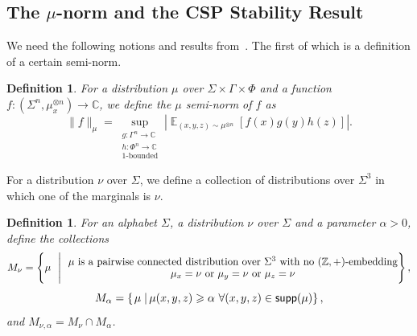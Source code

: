 \documentclass[11pt]{article}
\newtheorem{definition}[thm]{Definition}
\newcommand\card[1]{\left| {#1} \right|}
\newcommand\sett[2]{\left\{ \left. #1 \;\right\vert #2 \right\}}
\newcommand\norm[1]{\| #1 \|}
\newcommand\Expect[2]{{\mathop{\mathbb{E}}_{#1}\left[ {#2} \right]}}
\renewcommand\geq{\geqslant}
\begin{document}
\subsection{The \texorpdfstring{$\mu$}{mu}-norm and the CSP Stability Result}
We need the following notions and results from~\cite{BKM5}. The first of which is a definition of a certain semi-norm.
	\begin{definition}
		For a distribution $\mu$ over $\Sigma\times \Gamma\times \Phi$
		and a function $f\colon (\Sigma^n,\mu_x^{\otimes n})\to\mathbb{C}$,
		we define the $\mu$ semi-norm of $f$ as
		\[
		\norm{f}_{\mu}
		=\sup_{\substack{g\colon \Gamma^n\to\mathbb{C}\\ h\colon \Phi^n\to\mathbb{C}\\ \text{$1$-bounded}}}\card{\Expect{(x,y,z)\sim \mu^{\otimes n}}{f(x)g(y)h(z)}}.
		\]
	\end{definition}
    For a distribution $\nu$ over $\Sigma$, we define a collection of distributions over $\Sigma^3$ in which one of the marginals is $\nu$.
	\begin{definition}\label{def:set_of_dists}
		For an alphabet $\Sigma$, a distribution $\nu$ over $\Sigma$ and a parameter $\alpha>0$, define the collections
		\[
		M_{\nu} = \left\{\mu~~\Bigg|~~\substack{\text{\normalsize $\mu$ is a pairwise connected distribution over $\Sigma^3$ with no $(\mathbb{Z}, +)$-embedding}\\\\
        \text{\normalsize$\mu_x = \nu$\text{ or }$\mu_y=\nu$\text{ or }$\mu_z = \nu$}}\right\},
		\]
		\[
		M_{\alpha} = \sett{\mu}{\mu(x,y,z)\geq \alpha~\forall(x,y,z)\in {\sf supp}(\mu)},
		\]
		and $M_{\nu,\alpha} = M_{\nu}\cap M_{\alpha}$.
	\end{definition}
	
\end{document}
